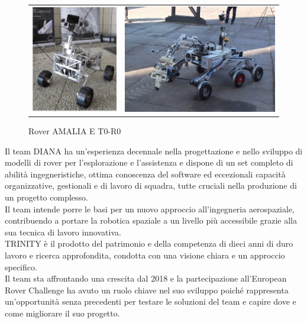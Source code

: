 \documentclass[%
corpo=11pt,
twoside,
 stile=classica,
oldstyle,
greek,%
]{toptesi}
\begin{document}
\begin{figure}
	\centering
	\begin{tabular}{ll}
		\includegraphics[width=.3\textwidth]{image/amalia.png}
&
		\includegraphics[width=.5\textwidth]{image/toro.jpg}
	\end{tabular}
		\caption{Rover AMALIA E T0-R0}
		\label{fig:amaliatoro}
	
\end{figure}

Il team DIANA ha un'esperienza decennale nella progettazione e nello sviluppo di modelli di rover per l'esplorazione e l'assistenza e dispone di un set completo di abilità ingegneristiche, ottima conoscenza del software ed eccezionali capacità organizzative, gestionali e di lavoro di squadra, tutte cruciali nella produzione di un progetto complesso.\\
Il team intende porre le basi per un nuovo approccio all'ingegneria aerospaziale, contribuendo a portare la robotica spaziale a un livello più accessibile grazie alla sua tecnica di lavoro innovativa.\\
TRINITY è il prodotto del patrimonio e della competenza di dieci anni di duro lavoro e ricerca approfondita, condotta con una visione chiara e un approccio specifico.\\
Il team sta affrontando una crescita dal 2018 e la partecipazione all'European Rover Challenge ha avuto un ruolo chiave nel suo sviluppo poiché rappresenta un'opportunità senza precedenti per testare le soluzioni del team e capire dove e come migliorare il suo progetto.
\end{document}
